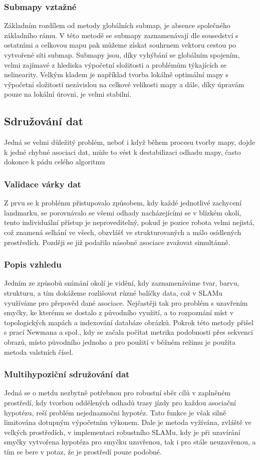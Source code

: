 \documentclass[11pt]{article}
\begin{document}
\subsubsection{Submapy vztažné}
Základním rozdílem od metody globálních submap, je absence společného základního rámu. V této metodě se submapy zaznamenávají dle sousedství s ostatními a celkovou mapu pak můžeme získat souhrnem vektoru cestou po vytvořené síti submap. Submapy jsou, díky vyhýbání se globálním spojením, velmi zajímavé z hlediska výpočetní složitosti a problémům týkajících se nelinearity. Velkým kladem je například tvorba lokálně optimální mapy s výpočetní složitostí nezávislou na celkové velikosti mapy a dále, díky úpravám pouze na lokální úrovni, je velmi stabilní.
\subsection{Sdružování dat}
Jedná se velmi důležitý problém, neboť i když během procesu tvorby mapy, dojde k jedné chybné asociaci dat, může to vést k destabilizaci odhadu mapy, často dokonce k pádu celého algoritmu
\subsubsection{Validace várky dat}
Z prvu se k problému přistupovalo způsobem, kdy každé jednotlivé zachycení landmarku, se porovnávalo se všemi odhady nacházejícími se v blízkém okolí, tento individuální přístup je neproveditelný, pokud je pozice robota velmi nejistá, což znamená selhání ve všech, obzvlášť ve strukturovaných a málo osídlených prostředích. Později se již podařilo násobné asociace zvažovat simultánně. 
\subsubsection{Popis vzhledu}
Jedním ze způsobů snímání okolí je vidění, kdy zaznamenáváme tvar, barvu, strukturu, a tím dokážeme rozlišovat různé balíčky data, což v SLAMu využíváme pro přepověd dané asociace. Nejčastěji tak pro problém s uzavřením smyčky, ke kterému se dostalo z původního využití, a to rozpoznání míst v topologických mapách a indexování databáze obrázků. Pokrok této metody přišel s prací Newmana a spol., kdy se začala počítat metrika podobnosti přes sekvenci obrazů, místo původního jednoho a pro použití v běžném režimu je použita metoda valstních čísel. 
\subsubsection{Multihypoziční sdružování dat}
Jedná se o metdu nezbytně potřebnou pro robustní sběr cílů v zaplněném prostředí, kdy tvorbou oddělených odhadů trasy jízdy pro každou asociační hypotézu, reší problém nejednaznočni hypotéz. Tato funkce je však silně limitována dotupným výpočetním výkonem. Dale je metoda vyžívána, zvláště ve velkých prostředích, v implementaci robustního SLAMu, kdy je při uzavírání smyčky vytvořena hypotéza pro smyčku uzavřenou, tak i pro stále neuzavřenou, a tím se bere v potaz, že je prostředí pouze podobné. 
\end{document}

